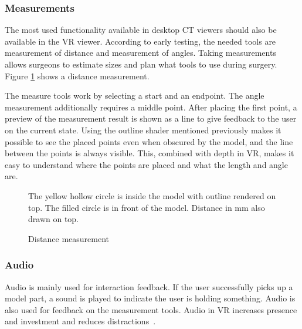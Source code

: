 \documentclass[a4paper]{report}
\begin{document}
\subsubsection{Measurements}
The most used functionality available in desktop CT viewers should also be available in the VR viewer. According to early testing, the needed tools are measurement of distance and measurement of angles. Taking measurements allows surgeons to estimate sizes and plan what tools to use during surgery.
Figure \ref{measure} shows a distance measurement.

The measure tools work by selecting a start and an endpoint. The angle measurement additionally requires a middle point.
After placing the first point, a preview of the measurement result is shown as a line to give feedback to the user on the current state.
Using the outline shader mentioned previously makes it possible to see the placed points even when obscured by the model, and the line between the points is always visible. This, combined with depth in VR, makes it easy to understand where the points are placed and what the length and angle are.

\begin{figure}[h!]
    \centering
	\hfill
	\caption{Distance measurement}\label{measure}
  \small
  The yellow hollow circle is inside the model with outline rendered on top. The filled circle is in front of the model. Distance in mm also drawn on top.
\end{figure}

\subsubsection{Audio}
Audio is mainly used for interaction feedback. If the user successfully picks up a model part, a sound is played to indicate the user is holding something. Audio is also used for feedback on the measurement tools. Audio in VR increases presence and investment and reduces distractions~\cite{kern_audio_2020}.
\end{document}
